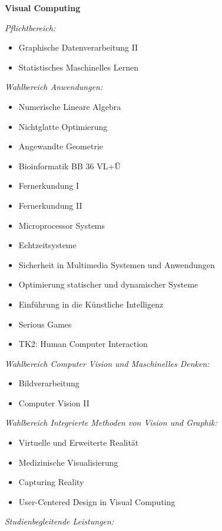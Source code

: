 {    \noindent\textbf{Visual Computing}

    \textit{Pflichtbereich:}
    \begin{itemize}[noitemsep]
        \item Graphische Datenverarbeitung II
        \item Statistisches Maschinelles Lernen
    \end{itemize}
    \textit{Wahlbereich Anwendungen:}
    \begin{itemize}[noitemsep]
        \item Numerische Lineare Algebra
        \item Nichtglatte Optimierung
        \item Angewandte Geometrie
        \item Bioinformatik BB 36 VL+Ü
        \item Fernerkundung I
        \item Fernerkundung II
        \item Microprocessor Systems
        \item Echtzeitsysteme
        \item Sicherheit in Multimedia Systemen und Anwendungen
        \item Optimierung statischer und dynamischer Systeme
        \item Einführung in die Künstliche Intelligenz
        \item Serious Games
        \item TK2: Human Computer Interaction
    \end{itemize}
    \textit{Wahlbereich Computer Vision und Maschinelles Denken:}
    \begin{itemize}[noitemsep]
        \item Bildverarbeitung
        \item Computer Vision II
    \end{itemize}
    \textit{Wahlbereich Integrierte Methoden von Vision und Graphik:}
    \begin{itemize}[noitemsep]
        \item Virtuelle und Erweiterte Realität
        \item Medizinische Visualisierung
        \item Capturing Reality
        \item User-Centered Design in Visual Computing
    \end{itemize}
    \textit{Studienbegleitende Leistungen:}
    \begin{itemize}[noitemsep]

\end{itemize}}
